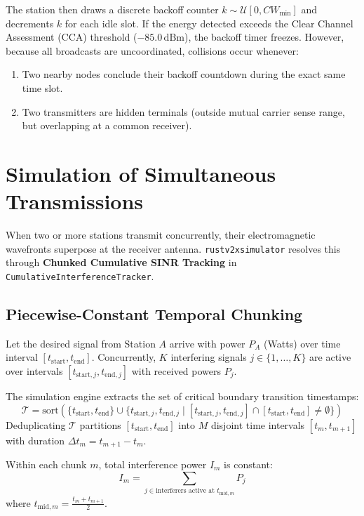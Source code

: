 \documentclass[11pt,a4paper]{article}
\begin{document}
The station then draws a discrete backoff counter $k \sim \mathcal{U}[0, CW_{\mathrm{min}}]$ and decrements $k$ for each idle slot. If the energy detected exceeds the Clear Channel Assessment (CCA) threshold ($-85.0\,\mathrm{dBm}$), the backoff timer freezes.
However, because all broadcasts are uncoordinated, collisions occur whenever:
\begin{enumerate}[noitemsep]
    \item Two nearby nodes conclude their backoff countdown during the exact same time slot.
    \item Two transmitters are hidden terminals (outside mutual carrier sense range, but overlapping at a common receiver).
\end{enumerate}

\section{Simulation of Simultaneous Transmissions}

When two or more stations transmit concurrently, their electromagnetic wavefronts superpose at the receiver antenna. \texttt{rustv2xsimulator} resolves this through \textbf{Chunked Cumulative SINR Tracking} in \texttt{CumulativeInterferenceTracker}.

\subsection{Piecewise-Constant Temporal Chunking}
Let the desired signal from Station $A$ arrive with power $P_A$ (Watts) over time interval $[t_{\mathrm{start}}, t_{\mathrm{end}}]$. Concurrently, $K$ interfering signals $j \in \{1, \dots, K\}$ are active over intervals $[t_{\mathrm{start}, j}, t_{\mathrm{end}, j}]$ with received powers $P_j$.

The simulation engine extracts the set of critical boundary transition timestamps:
\begin{equation}
\mathcal{T} = \mathrm{sort}\left( \{t_{\mathrm{start}}, t_{\mathrm{end}}\} \cup \{ t_{\mathrm{start}, j}, t_{\mathrm{end}, j} \mid [t_{\mathrm{start}, j}, t_{\mathrm{end}, j}] \cap [t_{\mathrm{start}}, t_{\mathrm{end}}] \neq \emptyset \} \right)
\end{equation}
Deduplicating $\mathcal{T}$ partitions $[t_{\mathrm{start}}, t_{\mathrm{end}}]$ into $M$ disjoint time intervals $[t_m, t_{m+1}]$ with duration $\Delta t_m = t_{m+1} - t_m$.

Within each chunk $m$, total interference power $I_m$ is constant:
\begin{equation}
I_m = \sum_{j \in \text{interferers active at } t_{\mathrm{mid}, m}} P_j
\end{equation}
where $t_{\mathrm{mid}, m} = \frac{t_m + t_{m+1}}{2}$.
\end{document}
